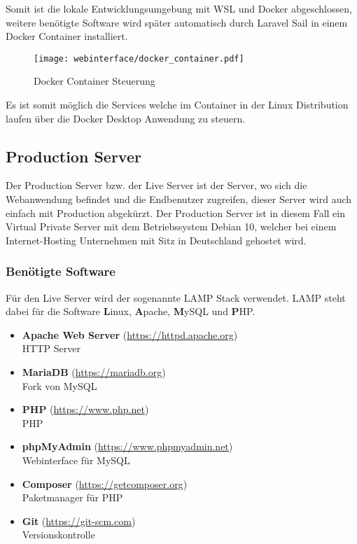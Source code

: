Somit ist die lokale Entwicklungsumgebung mit WSL und Docker abgeschlossen,
weitere benötigte Software wird später automatisch durch Laravel Sail in einem Docker
Container installiert.


\begin{figure}[H]
  \centering
  \texttt{[image: webinterface/docker\_container.pdf]}
  \caption{Docker Container Steuerung}
\end{figure}

Es ist somit möglich die Services welche im Container in der Linux Distribution
laufen über die Docker Desktop Anwendung zu steuern.

\subsection{Production Server}
Der Production Server bzw. der Live Server ist der Server, wo sich die
Webanwendung befindet und die Endbenutzer zugreifen, dieser Server wird auch
einfach mit Production abgekürzt. Der Production Server ist in diesem Fall ein
Virtual Private Server mit dem Betriebssystem Debian 10, welcher bei einem
Internet-Hosting Unternehmen mit Sitz in Deutschland gehostet wird.

\subsubsection{Benötigte Software}

Für den Live Server wird der sogenannte \glqq LAMP\grqq{} Stack verwendet. LAMP steht dabei
für die Software \textbf{L}inux, \textbf{A}pache, \textbf{M}ySQL und \textbf{P}HP.

\begin{itemize}
  \item \textbf{Apache Web Server} (\url{https://httpd.apache.org}) \\ HTTP Server
  \item \textbf{MariaDB} (\url{https://mariadb.org}) \\ Fork von MySQL
  \item \textbf{PHP} (\url{https://www.php.net}) \\ \ac*{PHP}
  \item \textbf{phpMyAdmin} (\url{https://www.phpmyadmin.net}) \\ Webinterface
        für MySQL
  \item \textbf{Composer} (\url{https://getcomposer.org}) \\ Paketmanager für PHP
  \item \textbf{Git} (\url{https://git-scm.com}) \\ Versionskontrolle
\end{itemize}


